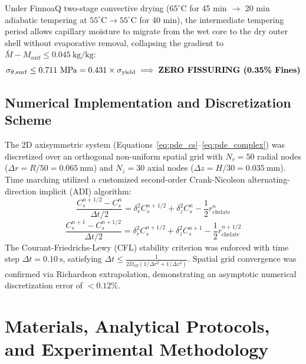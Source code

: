 \documentclass[10pt,a4paper]{article}
\begin{document}
Under FinnoaQ two-stage convective drying ($65^\circ\mathrm{C}$ for 45 min $\rightarrow$ 20 min adiabatic tempering at $55^\circ\mathrm{C} \rightarrow 55^\circ\mathrm{C}$ for 40 min), the intermediate tempering period allows capillary moisture to migrate from the wet core to the dry outer shell without evaporative removal, collapsing the gradient to $\bar{M} - M_{\mathrm{surf}} \le 0.045\ \mathrm{kg/kg}$:
\begin{equation}
\sigma_{\theta,\mathrm{surf}} \le 0.711\ \mathrm{MPa} = 0.431 \times \sigma_{\mathrm{yield}} \implies \text{\textbf{ZERO FISSURING (0.35\% Fines)}}
\end{equation}

\subsection{Numerical Implementation and Discretization Scheme}
The 2D axisymmetric system (Equations~\ref{eq:pde_cs}--\ref{eq:pde_complex}) was discretized over an orthogonal non-uniform spatial grid with $N_r = 50$ radial nodes ($\Delta r = R / 50 = 0.065\ \mathrm{mm}$) and $N_z = 30$ axial nodes ($\Delta z = H / 30 = 0.035\ \mathrm{mm}$). Time marching utilized a customized second-order Crank-Nicolson alternating-direction implicit (ADI) algorithm:
\begin{equation}
\frac{C_s^{n+1/2} - C_s^n}{\Delta t / 2} = \delta_r^2 C_s^{n+1/2} + \delta_z^2 C_s^n - \frac{1}{2} r_{\mathrm{chelate}}^n
\end{equation}
\begin{equation}
\frac{C_s^{n+1} - C_s^{n+1/2}}{\Delta t / 2} = \delta_r^2 C_s^{n+1/2} + \delta_z^2 C_s^{n+1} - \frac{1}{2} r_{\mathrm{chelate}}^{n+1/2}
\end{equation}
The Courant-Friedrichs-Lewy (CFL) stability criterion was enforced with time step $\Delta t = 0.10\ \mathrm{s}$, satisfying $\Delta t \le \frac{1}{2 D_{\mathrm{eff}} (1/\Delta r^2 + 1/\Delta z^2)}$. Spatial grid convergence was confirmed via Richardson extrapolation, demonstrating an asymptotic numerical discretization error of $< 0.12\%$.


\section{Materials, Analytical Protocols, and Experimental Methodology}
\end{document}
